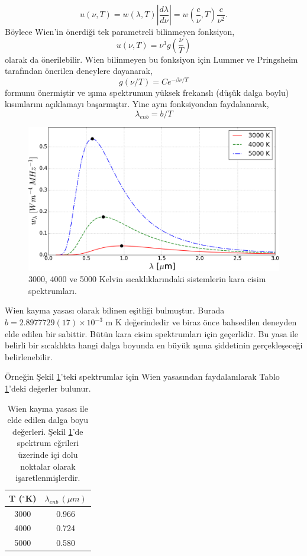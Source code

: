 \documentclass[a4paper,12pt, twoside]{article}
\begin{document}
\begin{equation}
\label{eq:uw_densities}
u(\nu,T) = w(\lambda,T)\left|\frac{d\lambda}{d\nu}\right| = w(\frac{c}{\nu},T)\frac{c}{\nu^2}.
\end{equation}
Böylece Wien'in önerdiği tek parametreli bilinmeyen fonksiyon,
\begin{equation}
\label{eq:ug_lambdaT}
u(\nu,T) = \nu^3 g(\frac{\nu}{T})
\end{equation}
olarak da önerilebilir. Wien bilinmeyen bu fonksiyon için Lummer ve Pringsheim tarafından önerilen deneylere dayanarak,
\begin{equation}
\label{eq:g_lambdaT}
g(\nu/T) = C e^{-\beta \nu/T}
\end{equation}
formunu önermiştir ve ışıma spektrumun yüksek frekanslı (düşük dalga boylu) kısımlarını açıklamayı başarmıştır. Yine aynı fonksiyondan faydalanarak,
\begin{equation}
\label{eq:wien_shift}
\lambda_{enb} = b/T 
\end{equation}
\begin{figure}[hbtp]
\center
\includegraphics[scale=.4]{blackbody_spect_vs_wavelength.png}
\caption{3000, 4000 ve 5000 Kelvin sıcaklıklarındaki sistemlerin kara cisim spektrumları.}
\label{fig:karaSpektrum}
\end{figure}
Wien kayma yasası olarak bilinen eşitliği bulmuştur. Burada $b = 2.8977729(17)\times10^{-3}$ m K değerindedir ve biraz önce bahsedilen deneyden elde edilen bir sabittir. Bütün kara cisim spektrumları için geçerlidir. Bu yasa ile belirli bir sıcaklıkta hangi dalga boyunda en büyük ışıma şiddetinin gerçekleşeceği belirlenebilir.

Örneğin Şekil \ref{fig:karaSpektrum}'teki spektrumlar için Wien yasasından faydalanılarak Tablo \ref{tab:wien_shift}'deki değerler bulunur.
\begin{table}[hbtp]
\center
\begin{tabular}{|c|c|}
\hline
T ($^\circ$K) & $\lambda_{enb}\,(\mu m)$\\
\hline
3000 & 0.966 \\
4000 & 0.724 \\
5000 & 0.580 \\
\hline
\end{tabular}
\caption{\label{tab:wien_shift} Wien kayma yasası ile elde edilen dalga boyu değerleri. Şekil \ref{fig:karaSpektrum}'de spektrum eğrileri üzerinde içi dolu noktalar olarak işaretlenmişlerdir.}
\end{table}
\end{document}

